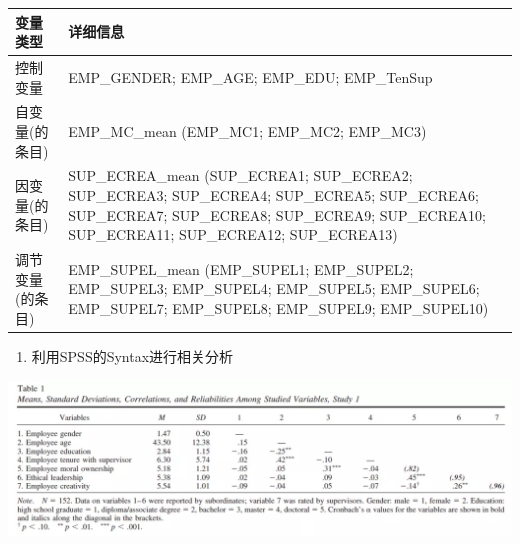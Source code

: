 \documentclass[
]{book}
\providecommand{\tightlist}{%
  \setlength{\itemsep}{0pt}\setlength{\parskip}{0pt}}
\begin{document}
\begin{longtable}[]{@{}ll@{}}
\toprule
\begin{minipage}[b]{0.35\columnwidth}\raggedright
变量类型\strut
\end{minipage} & \begin{minipage}[b]{0.59\columnwidth}\raggedright
详细信息\strut
\end{minipage}\tabularnewline
\midrule
\endhead
\begin{minipage}[t]{0.35\columnwidth}\raggedright
控制变量\strut
\end{minipage} & \begin{minipage}[t]{0.59\columnwidth}\raggedright
EMP\_GENDER; EMP\_AGE; EMP\_EDU; EMP\_TenSup\strut
\end{minipage}\tabularnewline
\begin{minipage}[t]{0.35\columnwidth}\raggedright
自变量(的条目)\strut
\end{minipage} & \begin{minipage}[t]{0.59\columnwidth}\raggedright
EMP\_MC\_mean (EMP\_MC1; EMP\_MC2; EMP\_MC3)\strut
\end{minipage}\tabularnewline
\begin{minipage}[t]{0.35\columnwidth}\raggedright
因变量(的条目)\strut
\end{minipage} & \begin{minipage}[t]{0.59\columnwidth}\raggedright
SUP\_ECREA\_mean (SUP\_ECREA1; SUP\_ECREA2; SUP\_ECREA3; SUP\_ECREA4; SUP\_ECREA5; SUP\_ECREA6; SUP\_ECREA7; SUP\_ECREA8; SUP\_ECREA9; SUP\_ECREA10; SUP\_ECREA11; SUP\_ECREA12; SUP\_ECREA13)\strut
\end{minipage}\tabularnewline
\begin{minipage}[t]{0.35\columnwidth}\raggedright
调节变量(的条目)\strut
\end{minipage} & \begin{minipage}[t]{0.59\columnwidth}\raggedright
EMP\_SUPEL\_mean (EMP\_SUPEL1; EMP\_SUPEL2; EMP\_SUPEL3; EMP\_SUPEL4; EMP\_SUPEL5; EMP\_SUPEL6; EMP\_SUPEL7; EMP\_SUPEL8; EMP\_SUPEL9; EMP\_SUPEL10)\strut
\end{minipage}\tabularnewline
\bottomrule
\end{longtable}

\begin{enumerate}
\def\labelenumi{\arabic{enumi}.}
\tightlist
\item
  利用SPSS的Syntax进行相关分析
\end{enumerate}

\includegraphics{figs/1311.png}
\end{document}
